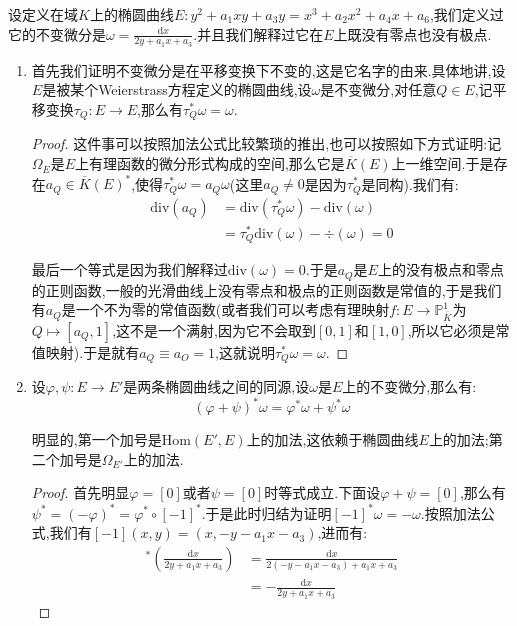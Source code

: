设定义在域$K$上的椭圆曲线$E:y^2+a_1xy+a_3y=x^3+a_2x^2+a_4x+a_6$,我们定义过它的不变微分是$\omega=\frac{\mathrm{d}x}{2y+a_1x+a_3}$.并且我们解释过它在$E$上既没有零点也没有极点.
\begin{enumerate}
	\item 首先我们证明不变微分是在平移变换下不变的,这是它名字的由来.具体地讲,设$E$是被某个Weierstrass方程定义的椭圆曲线,设$\omega$是不变微分,对任意$Q\in E$,记平移变换$\tau_Q:E\to E$,那么有$\tau_Q^*\omega=\omega$.
	\begin{proof}
		
		这件事可以按照加法公式比较繁琐的推出,也可以按照如下方式证明:记$\Omega_E$是$E$上有理函数的微分形式构成的空间,那么它是$\overline{K}(E)$上一维空间.于是存在$a_Q\in\overline{K}(E)^*$,使得$\tau_Q^*\omega=a_Q\omega$(这里$a_Q\not=0$是因为$\tau_Q^*$是同构).我们有:
		\begin{align*}
			\mathrm{div}(a_Q)&=\mathrm{div}(\tau_Q^*\omega)-\mathrm{div}(\omega)\\&=\tau_Q^*\mathrm{div}(\omega)-\mathrm{\div}(\omega)=0
		\end{align*}
		
		最后一个等式是因为我们解释过$\mathrm{div}(\omega)=0$.于是$a_Q$是$E$上的没有极点和零点的正则函数,一般的光滑曲线上没有零点和极点的正则函数是常值的,于是我们有$a_Q$是一个不为零的常值函数(或者我们可以考虑有理映射$f:E\to\mathbb{P}^1_{\overline{K}}$为$Q\mapsto[a_Q,1]$,这不是一个满射,因为它不会取到$[0,1]$和$[1,0]$,所以它必须是常值映射).于是就有$a_Q\equiv a_O=1$,这就说明$\tau_Q^*\omega=\omega$.
	\end{proof}
	\item 设$\varphi,\psi:E\to E'$是两条椭圆曲线之间的同源,设$\omega$是$E$上的不变微分,那么有:
	$$(\varphi+\psi)^*\omega=\varphi^*\omega+\psi^*\omega$$
	
	明显的,第一个加号是$\mathrm{Hom}(E',E)$上的加法,这依赖于椭圆曲线$E$上的加法;第二个加号是$\Omega_{E'}$上的加法.
	\begin{proof}
		
		首先明显$\varphi=[0]$或者$\psi=[0]$时等式成立.下面设$\varphi+\psi=[0]$,那么有$\psi^*=(-\varphi)^*=\varphi^*\circ[-1]^*$.于是此时归结为证明$[-1]^*\omega=-\omega$.按照加法公式,我们有$[-1](x,y)=(x,-y-a_1x-a_3)$,进而有:
		\begin{align*}
			[-1]^*\left(\frac{\mathrm{d}x}{2y+a_1x+a_3}\right)&=\frac{\mathrm{d}x}{2(-y-a_1x-a_3)+a_1x+a_3}\\&=-\frac{\mathrm{d}x}{2y+a_1x+a_3}
		\end{align*}
		

\end{proof}
\end{enumerate}
